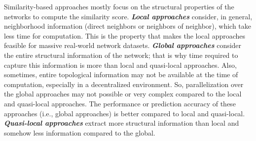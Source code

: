 Similarity-based approaches mostly focus on the structural properties of
the networks to compute the similarity score. \textbf{\emph{Local
        approaches}} consider, in general, neighborhood information (direct
neighbors or neighbors of neighbor), which take less time for
computation. This is the property that makes the local approaches
feasible for massive real-world network datasets. \textbf{\emph{Global
        approaches}} consider the entire structural information of the network;
that is why time required to capture this information is more than local
and quasi-local approaches. Also, sometimes, entire topological
information may not be available at the time of computation, especially
in a decentralized environment. So, parallelization over the global
approaches may not possible or very complex compared to the local and
quasi-local approaches. The performance or prediction accuracy of these
approaches (i.e., global approaches) is better compared to local and
quasi-local. \textbf{\emph{Quasi-local approaches}} extract more
structural information than local and somehow less information compared
to the global.

